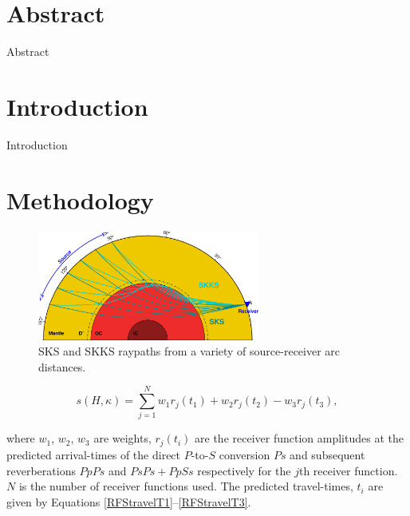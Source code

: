 \documentclass[12pt,twoside]{article}
\begin{document}

\newpage


\newpage
\tableofcontents
\thispagestyle{empty}
\newpage


\thispagestyle{empty}
\listoffigures
\listoftables
\newpage

\section*{Abstract}
Abstract

\section{Introduction}
Introduction


\section{Methodology}

\begin{figure}[tbhp]
\centering
\includegraphics[width=0.65\textwidth, angle=0]{figures/raypath.png}
\caption[SKS/SKKS raypaths] {SKS and SKKS raypaths from a variety of source-receiver arc distances.}
\label{raypath}
\end{figure}

\begin{equation}
s(H,\kappa) = \sum_{j=1}^{N} w_{1}r_{j}(t_{1}) + w_{2}r_{j}(t_{2}) - w_{3}r_{j}(t_{3}),
\label{HKobjective}
\end{equation}

where $w_{1}$, $w_{2}$, $w_{3}$ are weights, $r_{j}(t_{i})$ are the receiver function amplitudes at the predicted arrival-times of the direct $P$-to-$S$ conversion $Ps$ and subsequent reverberations $PpPs$ and $PsPs + PpSs$ respectively for the $j$th receiver function.  $N$ is the number of receiver functions used.  The predicted travel-times, $t_{i}$ are given by Equations \ref{RFStravelT1}--\ref{RFStravelT3}.
\end{document}
